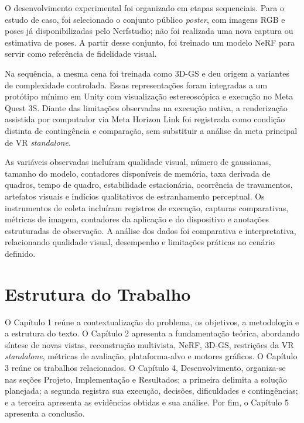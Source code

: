 O desenvolvimento experimental foi organizado em etapas sequenciais. Para o estudo de caso, foi selecionado o conjunto público \textit{poster}, com imagens RGB e poses já disponibilizadas pelo Nerfstudio; não foi realizada uma nova captura ou estimativa de poses. A partir desse conjunto, foi treinado um modelo NeRF para servir como referência de fidelidade visual.

Na sequência, a mesma cena foi treinada como 3D-GS e deu origem a variantes de complexidade controlada. Essas representações foram integradas a um protótipo mínimo em Unity com visualização estereoscópica e execução no Meta Quest 3S. Diante das limitações observadas na execução nativa, a renderização assistida por computador via Meta Horizon Link foi registrada como condição distinta de contingência e comparação, sem substituir a análise da meta principal de VR \textit{standalone}.

As variáveis observadas incluíram qualidade visual, número de gaussianas, tamanho do modelo, contadores disponíveis de memória, taxa derivada de quadros, tempo de quadro, estabilidade estacionária, ocorrência de travamentos, artefatos visuais e indícios qualitativos de estranhamento perceptual. Os instrumentos de coleta incluíram registros de execução, capturas comparativas, métricas de imagem, contadores da aplicação e do dispositivo e anotações estruturadas de observação. A análise dos dados foi comparativa e interpretativa, relacionando qualidade visual, desempenho e limitações práticas no cenário definido.

\section{Estrutura do Trabalho}

O Capítulo 1 reúne a contextualização do problema, os objetivos, a metodologia e a estrutura do texto. O Capítulo 2 apresenta a fundamentação teórica, abordando síntese de novas vistas, reconstrução multivista, NeRF, 3D-GS, restrições da VR \textit{standalone}, métricas de avaliação, plataforma-alvo e motores gráficos. O Capítulo 3 reúne os trabalhos relacionados. O Capítulo 4, Desenvolvimento, organiza-se nas seções Projeto, Implementação e Resultados: a primeira delimita a solução planejada; a segunda registra sua execução, decisões, dificuldades e contingências; e a terceira apresenta as evidências obtidas e sua análise. Por fim, o Capítulo 5 apresenta a conclusão.
